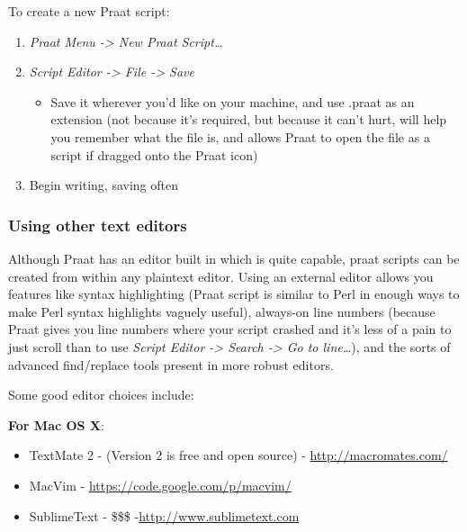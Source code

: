 To create a new Praat script:

\begin{enumerate}
\def\labelenumi{\arabic{enumi}.}
\tightlist
\item
  \emph{Praat Menu -\textgreater{} New Praat Script\ldots{}}
\item
  \emph{Script Editor -\textgreater{} File -\textgreater{} Save}

  \begin{itemize}
  \tightlist
  \item
    Save it wherever you'd like on your machine, and use .praat as an
    extension (not because it's required, but because it can't hurt,
    will help you remember what the file is, and allows Praat to open
    the file as a script if dragged onto the Praat icon)
  \end{itemize}
\item
  Begin writing, saving often
\end{enumerate}

\hypertarget{using-other-text-editors}{%
\subsubsection{Using other text
editors}\label{using-other-text-editors}}

Although Praat has an editor built in which is quite capable, praat
scripts can be created from within any plaintext editor. Using an
external editor allows you features like syntax highlighting (Praat
script is similar to Perl in enough ways to make Perl syntax highlights
vaguely useful), always-on line numbers (because Praat gives you line
numbers where your script crashed and it's less of a pain to just scroll
than to use \emph{Script Editor -\textgreater{} Search -\textgreater{}
Go to line\ldots{}}), and the sorts of advanced find/replace tools
present in more robust editors.

Some good editor choices include:

\textbf{For Mac OS X}:

\begin{itemize}
\tightlist
\item
  TextMate 2 - (Version 2 is free and open source) -
  \url{http://macromates.com/}
\item
  MacVim - \url{https://code.google.com/p/macvim/}
\item
  SublimeText - \$\$\$ -\url{http://www.sublimetext.com}
\end{itemize}

